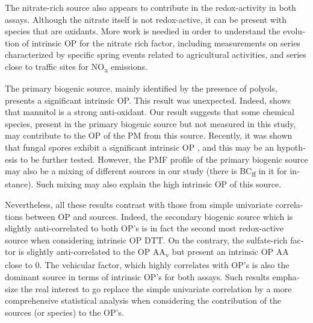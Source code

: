 \begin{otherlanguage}{english}
The nitrate-rich source also appears to contribute in the redox-activity in both
assays. Although the nitrate itself is not redox-active, it can be present with
species that are oxidants. More work is needied in order to understand the
evolution of intrinsic OP for the nitrate rich factor, including measurements on
series characterized by specific spring events related to agricultural
activities, and series close to traffic sites for NO\textsubscript{x} emissions.

The primary biogenic source, mainly identified by the presence of polyols,
presents a significant intrinsic OP. This result was unexpected. Indeed,
\textcite{liuTherapeutic2010} shows that mannitol is a strong anti-oxidant. Our
result suggests that some chemical species, present in the primary biogenic
source but not measured in this study, may contribute to the OP of the PM from
this source. Recently, it was shown that fungal spores exhibit a significant
intrinsic OP \parencite{samakeUnexpected2017}, and this may be an hypothesis to be
further tested. However, the PMF profile of the primary biogenic source may also
be a mixing of different sources in our study (there is BC\textsubscript{ff} in
it for instance). Such mixing may also explain the high intrinsic OP of this
source.

Nevertheless, all these results contrast with those from simple univariate
correlations between OP and sources. Indeed, the secondary biogenic source which
is slightly anti-correlated to both OP’s is in fact the second most redox-active
source when considering intrinsic OP DTT. On the contrary, the sulfate-rich
factor is slightly anti-correlated to the OP AA\textsubscript{v} but present an
intrinsic OP AA close to 0. The vehicular factor, which highly correlates with
OP’s is also the dominant source in terms of intrinsic OP’s for both assays.
Such results emphasize the real interest to go replace the simple univariate
correlation by a more comprehensive statistical analysis when considering the
contribution of the sources (or species) to the OP’s.



\end{otherlanguage}
